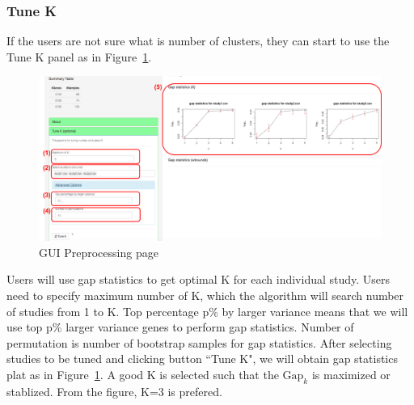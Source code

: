 \documentclass{article}
\begin{document}
\subsubsection{Tune K}
If the users are not sure what is number of clusters,
they can start to use the Tune K panel as in Figure~\ref{fig:metaClusttuneK}.
\begin{figure}[H]
\begin{center}
\includegraphics[scale=0.35]{./figure/metaClust/tuneK}
\caption{GUI Preprocessing page}
\label{fig:metaClusttuneK}
\end{center}
\end{figure}
Users will use gap statistics to get optimal K for each individual study.
Users need to specify maximum number of K, which the algorithm will search number of studies from 1 to K.
Top percentage p\% by larger variance means that we will use top p\% larger variance genes to perform gap statistics.
Number of permutation is number of bootstrap samples for gap statistics.
After selecting studies to be tuned and clicking button ``Tune K",
we will obtain gap statistics plat as in Figure~\ref{fig:metaClusttuneK}.
A good K is selected such that the $\mbox{Gap}_k$ is maximized or stablized.
From the figure, K=3 is prefered.
\end{document}
